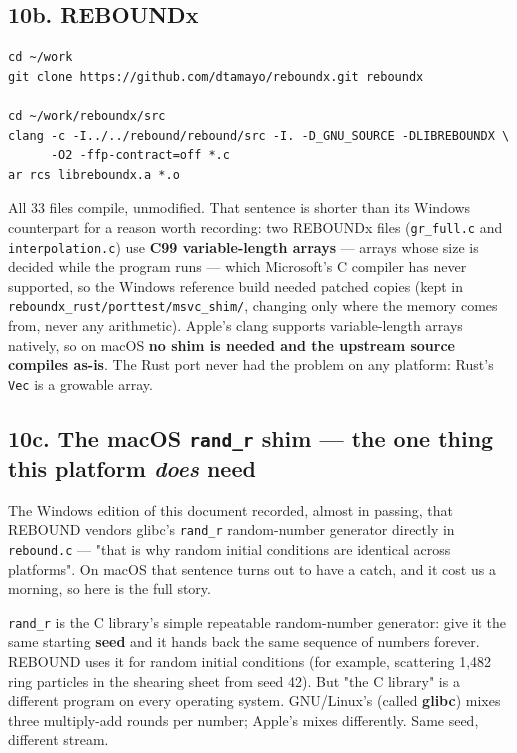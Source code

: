 \documentclass[11pt]{article}
\begin{document}
\subsection{10b. REBOUNDx}

\begin{lstlisting}
cd ~/work
git clone https://github.com/dtamayo/reboundx.git reboundx

cd ~/work/reboundx/src
clang -c -I../../rebound/rebound/src -I. -D_GNU_SOURCE -DLIBREBOUNDX \
      -O2 -ffp-contract=off *.c
ar rcs libreboundx.a *.o
\end{lstlisting}

All 33 files compile, unmodified. That sentence is shorter than its Windows counterpart for a reason worth recording: two REBOUNDx files (\texttt{gr\_full.c} and \texttt{interpolation.c}) use \textbf{C99 variable-length arrays} --- arrays whose size is decided while the program runs --- which Microsoft's C compiler has never supported, so the Windows reference build needed patched copies (kept in \texttt{reboundx\_rust/porttest/msvc\_shim/}, changing only where the memory comes from, never any arithmetic). Apple's clang supports variable-length arrays natively, so on macOS \textbf{no shim is needed and the upstream source compiles as-is}. The Rust port never had the problem on any platform: Rust's \texttt{Vec} is a growable array.

\subsection{10c. The macOS \texttt{rand\_r} shim --- the one thing this platform \emph{does} need}

The Windows edition of this document recorded, almost in passing, that REBOUND vendors glibc's \texttt{rand\_r} random-number generator directly in \texttt{rebound.c} --- "that is why random initial conditions are identical across platforms". On macOS that sentence turns out to have a catch, and it cost us a morning, so here is the full story.

\texttt{rand\_r} is the C library's simple repeatable random-number generator: give it the same starting \textbf{seed} and it hands back the same sequence of numbers forever. REBOUND uses it for random initial conditions (for example, scattering 1,482 ring particles in the shearing sheet from seed 42). But "the C library" is a different program on every operating system. GNU/Linux's (called \textbf{glibc}) mixes three multiply-add rounds per number; Apple's mixes differently. Same seed, different stream.
\end{document}
